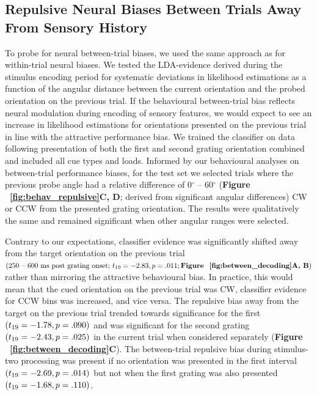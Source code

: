 \documentclass{article}
\begin{document}
\subsection{Repulsive Neural Biases Between Trials Away From Sensory History}

To probe for neural between-trial biases, we used the same approach as for within-trial neural biases. We tested the LDA-evidence derived during the stimulus encoding period for systematic deviations in likelihood estimations as a function of the angular distance between the current orientation and the probed orientation on the previous trial. If the behavioural between-trial bias reflects neural modulation during encoding of sensory features, we would expect to see an increase in likelihood estimations for orientations presented on the previous trial in line with the attractive performance bias. We trained the classifier on data following presentation of both the first and second grating orientation combined and included all cue types and loads. Informed by our behavioural analyses on between-trial performance biases, for the test set we selected trials where the previous probe angle had a relative difference of 0$^{\circ}$ – 60$^{\circ}$ (\textbf{Figure ~\ref{fig:behav_repulsive}C, D}; derived from significant angular differences) CW or CCW from the presented grating orientation. The results were qualitatively the same and remained significant when other angular ranges were selected. 

Contrary to our expectations, classifier evidence was significantly shifted away from the target orientation on the previous trial $(\text{250 – 600 ms post grating onset; } t\textsubscript{19} = -2.83, p = .011; \text{\textbf{Figure ~\ref{fig:between_decoding}A, B}})$ rather than mirroring the attractive behavioural bias. In practice, this would mean that the cued orientation on the previous trial was CW, classifier evidence for CCW bins was increased, and vice versa. The repulsive bias away from the target on the previous trial trended towards significance for the first $(t\textsubscript{19} = -1.78, p = .090)$ and was significant for the second grating $(t\textsubscript{19} = -2.43, p = .025)$ in the current trial when considered separately (\textbf{Figure ~\ref{fig:between_decoding}C}). The between-trial repulsive bias during stimulus-two processing was present if no orientation was presented in the first interval $(t\textsubscript{19} = -2.69, p = .014)$ but not when the first grating was also presented $(t\textsubscript{19} = -1.68, p = .110)$. 
\end{document}
